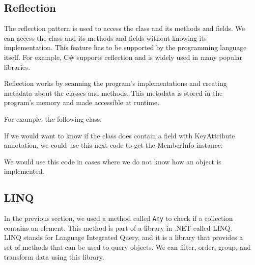 \subsection{Reflection}

The reflection pattern is used to access the class and its methods and fields. We can access the class and its methods and fields without knowing its implementation.
This feature has to be supported by the programming language itself. For example, C\# supports reflection and is widely used in many popular libraries.

Reflection works by scanning the program's implementations and creating metadata about the classes and methods.
This metadata is stored in the program's memory and made accessible at runtime.

For example, the following class:


If we would want to know if the class does contain a field with KeyAttribute annotation, we could use this next code to get the MemberInfo instance:


We would use this code in cases where we do not know how an object is implemented.

\subsection {LINQ}

In the previous section, we used a method called \texttt{Any} to check if a collection contains an element. This method is part of a library in .NET called LINQ.
LINQ stands for Language Integrated Query, and it is a library that provides a set of methods that can be used to query objects.
We can filter, order, group, and transform data using this library.

